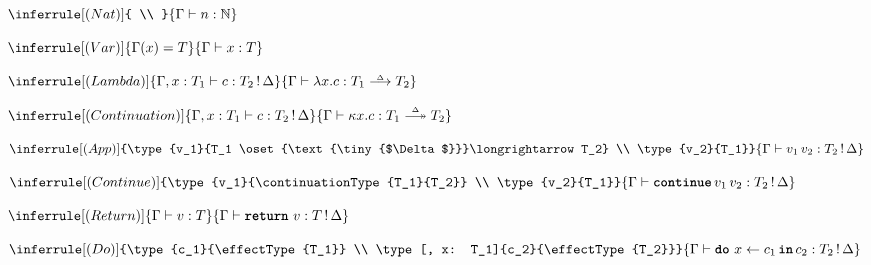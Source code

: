 \begin{figure}[t]
  \begin{eff-desc}
    \centering 
    \begin{minipage}[t]{0.2\textwidth}
      \centering
      $\inferrule[(Nat)]
      { \\ }
      {\type{n}{\mathbb{N}}}$
      \end{minipage}%
  \begin{minipage}[t]{0.2\textwidth}
    \centering
  $\inferrule[(Var)]
  {\Gamma(x) = T}
  {\type{x}{T}}$
  \end{minipage}%
  \begin{minipage}[t]{0.3\textwidth}
    \centering
  $\inferrule[(Lambda)]
    {\type[, x:T_1]{c}{\effectType{T_2}}}
    {\type{\function{x}{c}}{\functionType{T_1}{T_2}}}$
  \end{minipage}%
  \begin{minipage}[t]{0.3\textwidth}
  \centering
$\inferrule[(Continuation)]
  {\type[, x:T_1]{c}{\effectType{T_2}}}
  {\type{\continuation{x}{c}}{\continuationType{T_1}{T_2}}}$
\end{minipage}
  
  \vspace{5mm}
  
  \begin{minipage}[t]{0.5\textwidth}
    \centering
  $\inferrule[(App)]
    {\type{v_1}{T_1 \oset{\text{\tiny{$\Delta$}}}\longrightarrow T_2} \\ \type{v_2}{T_1}}
    {\type{v_1 \, v_2}{\effectType{T_2}}}$
  \end{minipage}%
  \begin{minipage}[t]{0.5\textwidth}
    \centering
  $\inferrule[(Continue)]
    {\type{v_1}{\continuationType{T_1}{T_2}} \\ \type{v_2}{T_1}}
    {\type{\continue{v_1}{v_2}}{\effectType{T_2}}}$
  \end{minipage}

  \vspace{5mm}

  \begin{minipage}[t]{0.3\textwidth}
    \centering
  $\inferrule[(Return)]
    {\type{v}{T}}
    {\type{\return{v}}{\effectType{T}}}$
  \end{minipage}%
  \begin{minipage}[t]{0.55\textwidth}
    \centering
  $\inferrule[(Do)]
    {\type{c_1}{\effectType{T_1}} \\ \type[, x: T_1]{c_2}{\effectType{T_2}}}
    {\type{\bind{x}{c_1}{c_2}}{\effectType{T_2}}}$
  \end{minipage}
  

\end{eff-desc}
\end{figure}
